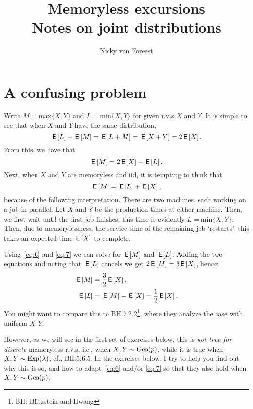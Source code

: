 \documentclass[a4paper,11pt]{article}
\title{Memoryless excursions\\
Notes on joint distributions }
\author{Nicky van Foreest}
\renewcommand{\max}[1]{\mathrm{max}\{#1\}}
\renewcommand{\min}[1]{\mathrm{min}\{#1\}}
\begin{document}
\maketitle
\tableofcontents



\section{A confusing problem}
\label{sec:confusing-problem}

Write $M=\max{X,Y}$ and $L=\min{X,Y}$ for given r.v.s $X$ and $Y$.
It is simple to see that when $X$ and $Y$  have the same distribution,
\begin{equation}
\,\mathsf{E}\left[L\right] + \,\mathsf{E}\left[M\right] = \,\mathsf{E}\left[L+M\right]=\,\mathsf{E}\left[X+Y\right] = 2\,\mathsf{E}\left[X\right].
\end{equation}
From this, we have that
\begin{equation}
  \label{eq:6}
\,\mathsf{E}\left[M\right] = 2\,\mathsf{E}\left[X\right] - \,\mathsf{E}\left[L\right].
\end{equation}
Next, when $X$ and $Y$ are memoryless and iid, it is  tempting to think that
\begin{equation}
  \label{eq:7}
\,\mathsf{E}\left[M\right] = \,\mathsf{E}\left[L\right]  + \,\mathsf{E}\left[X\right],
\end{equation}
because of  the following interpretation.
There are two machines, each working on a job in parallel.
Let $X$ and $Y$ be the production times at either machine.
Then, we first wait until the first job finishes; this time is evidently $L=\min{X, Y}$.
Then, due to memorylessness, the service time of the remaining job `restarts'; this takes an expected time $\,\mathsf{E}\left[X\right]$ to complete.

Using~\cref{eq:6} and \cref{eq:7}  we can solve for $\,\mathsf{E}\left[M\right]$ and $\,\mathsf{E}\left[L\right]$.
Adding the two equations and noting that $\,\mathsf{E}\left[L\right]$ cancels we get $2\,\mathsf{E}\left[M\right] = 3 \,\mathsf{E}\left[X\right] $, hence:
\begin{align}
\,\mathsf{E}\left[M\right] &= \frac 3 2 \,\mathsf{E}\left[X\right],\label{eq:35}\\
\,\mathsf{E}\left[L\right] &= \,\mathsf{E}\left[M\right] - \,\mathsf{E}\left[X\right] = \frac 1 2 \,\mathsf{E}\left[X\right].\label{eq:36}
\end{align}
You might want to compare this to BH.7.2.2\footnote{BH: Blitzstein and Hwang}, where they analyze the case with uniform $X, Y$.

However, as we will see in the first set of exercises below, this is \emph{ not true for discrete} memoryless r.v.s, i.e., when $X, Y \sim \mathrm{Geo}(p)$, while it is true when $X, Y \sim \mathrm{Exp}(\lambda)$, cf., BH.5.6.5.
In the exercises below, I try to help you find out why this is so, and how to adapt~\cref{eq:6} and/or \cref{eq:7} so that they also hold when $X,Y\sim\mathrm{Geo}(p)$.
\end{document}

